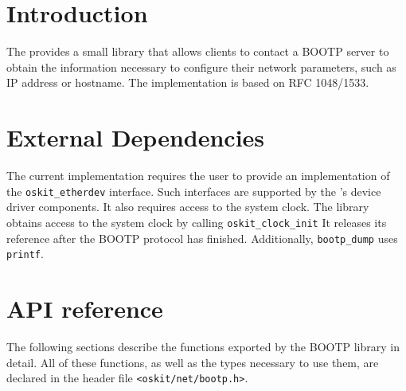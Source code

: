 %
% 
%
\label{bootp}

\newcommand{\bootp}{BOOTP}

\section{Introduction}

The \oskit{} provides a small library that allows \oskit{} clients to
contact a \bootp{} server to obtain the information necessary to 
configure their network parameters, such as IP address or hostname.
The implementation is based on RFC 1048/1533.

\section{External Dependencies}

The current implementation requires the user to provide an
implementation of the \texttt{oskit_etherdev} interface. Such interfaces
are supported by the \oskit{}'s device driver components.
It also requires access to the system clock. The library obtains 
access to the system clock by calling 
\texttt{oskit_clock_init}	%
It releases its reference after the \bootp{} protocol has finished.
Additionally, \texttt{bootp_dump} uses \texttt{printf}.

\section{API reference}

The following sections describe the functions exported by the \bootp{}
library in detail.
All of these functions, as well as the types necessary to use them,
are declared in the header file {\tt <oskit/net/bootp.h>}.

